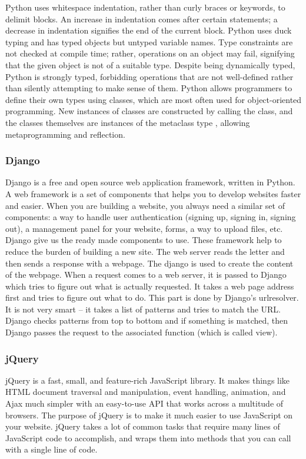 Python uses whitespace indentation, rather than curly braces or keywords, to delimit blocks. An increase in indentation comes after certain statements; a decrease in indentation signifies the end of the current block.
\newline
Python uses duck typing and has typed objects but untyped variable names. Type constraints are not checked at compile time; rather, operations on an object may fail, signifying that the given object is not of a suitable type. Despite being dynamically typed, Python is strongly typed, forbidding operations that are not well-defined rather than silently attempting to make sense of them.
\newline
Python allows programmers to define their own types using classes, which are most often used for object-oriented programming. New instances of classes are constructed by calling the class, and the classes themselves are instances of the metaclass type , allowing metaprogramming and reflection.

\subsubsection*{Django}
Django is a free and open source web application framework, written in Python. A web framework is a set of components that helps you to develop websites faster and easier. When you are  building a website, you always need a similar set of components: a way to handle user authentication (signing up, signing in, signing out), a management panel for your website, forms, a way to upload files, etc. Django give us the ready made components to use. These framework help to reduce the burden of building a new site. The web server reads the letter and then sends a response with a webpage. The django is used to create the content of the webpage.
\newline
When a request comes to a web server, it is passed to Django which tries to figure out what is actually requested. It takes a web page address first and tries to figure out what to do. This part is done by Django's urlresolver. It is not very smart – it takes a list of patterns and tries to match the URL. Django checks patterns from top to bottom and if something is matched, then Django passes the request to the associated function (which is called view).

\subsubsection*{jQuery}
jQuery is a fast, small, and feature-rich JavaScript library. It makes things like HTML document traversal and manipulation, event handling, animation, and Ajax much simpler with an easy-to-use API that works across a multitude of browsers.
\newline
The purpose of jQuery is to make it much easier to use JavaScript on your website. jQuery takes a lot of common tasks that require many lines of JavaScript code to accomplish, and wraps them into methods that you can call with a single line of code.

